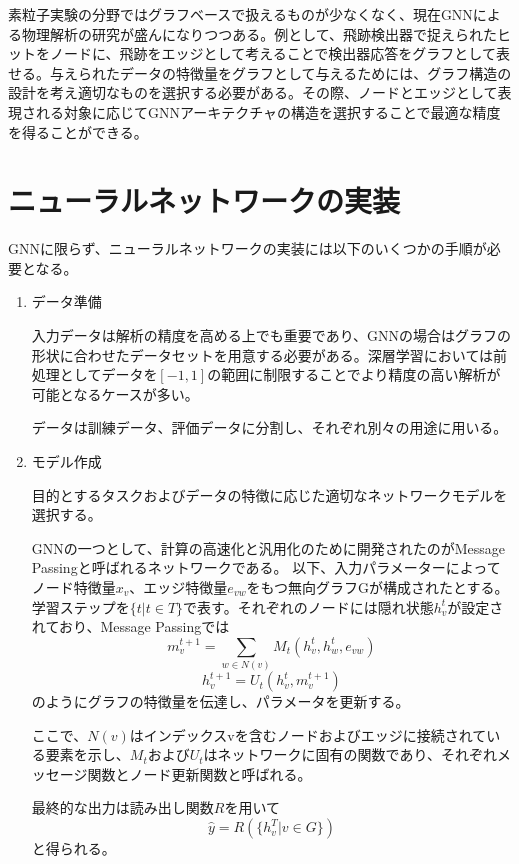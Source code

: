 素粒子実験の分野ではグラフベースで扱えるものが少なくなく、現在GNNによる物理解析の研究が盛んになりつつある。例として、飛跡検出器で捉えられたヒットをノードに、飛跡をエッジとして考えることで検出器応答をグラフとして表せる。与えられたデータの特徴量をグラフとして与えるためには、グラフ構造の設計を考え適切なものを選択する必要がある。その際、ノードとエッジとして表現される対象に応じてGNNアーキテクチャの構造を選択することで最適な精度を得ることができる。


\section{ニューラルネットワークの実装}
GNNに限らず、ニューラルネットワークの実装には以下のいくつかの手順が必要となる。

\begin{enumerate}
\item データ準備

入力データは解析の精度を高める上でも重要であり、GNNの場合はグラフの形状に合わせたデータセットを用意する必要がある。深層学習においては前処理としてデータを$[-1,1]$の範囲に制限することでより精度の高い解析が可能となるケースが多い。

データは訓練データ、評価データに分割し、それぞれ別々の用途に用いる。

\item モデル作成

目的とするタスクおよびデータの特徴に応じた適切なネットワークモデルを選択する。

GNNの一つとして、計算の高速化と汎用化のために開発されたのがMessage Passingと呼ばれるネットワークである。
以下、入力パラメーターによってノード特徴量$x_v$、エッジ特徴量$e_{vw}$をもつ無向グラフGが構成されたとする。学習ステップを$\{t|t\in T\}$で表す。それぞれのノードには隠れ状態$h_v^t$が設定されており、Message Passingでは
\begin{equation}
m_v^{t+1} = \sum_{w \in N(v)} M_t(h^t_v,h^t_w,e_{vw})
\end{equation}
\begin{equation}
h_v^{t+1} = U_t(h_v^t,m_v^{t+1})
\end{equation}
のようにグラフの特徴量を伝達し、パラメータを更新する。

ここで、$N(v)$はインデックスvを含むノードおよびエッジに接続されている要素を示し、$M_t$および$U_t$はネットワークに固有の関数であり、それぞれメッセージ関数とノード更新関数と呼ばれる。

最終的な出力は読み出し関数$R$を用いて
\begin{equation}
\hat{y} = R(\{h_v^T | v \in G\})
\end{equation}
と得られる。


\end{enumerate}
